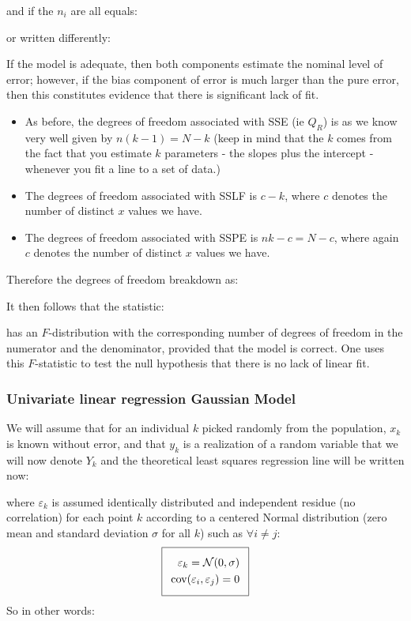 	and if the $n_i$ are all equals:
	
	or written differently:
	
	If the model is adequate, then both components estimate the nominal level of error; however, if the bias component of error is much larger than the pure error, then this constitutes evidence that there is significant lack of fit.
	
	\begin{itemize}
		\item As before, the degrees of freedom associated with SSE (ie $Q_R$) is as we know very well given by $n(k-1)=N-k$ (keep in mind that the $k$ comes from the fact that you estimate $k$ parameters - the slopes plus the intercept - whenever you fit a line to a set of data.)
	
		\item The degrees of freedom associated with SSLF is $c-k$, where $c$ denotes the number of distinct $x$ values we have.
	
		\item The degrees of freedom associated with SSPE is $nk-c=N-c$, where again $c$ denotes the number of distinct $x$ values we have.
	\end{itemize}
	Therefore the degrees of freedom breakdown as:
	
	It then follows that the statistic:
	
	has an $F$-distribution with the corresponding number of degrees of freedom in the numerator and the denominator, provided that the model is correct. One uses this $F$-statistic to test the null hypothesis that there is no lack of linear fit.
	
	
	
	\pagebreak
	\subsubsection{Univariate linear regression Gaussian Model}\label{univariate linear regression gaussian model}
	We will assume that for an individual $k$ picked randomly from the population, $x_k$ is known without error, and that $y_k$ is a realization of a random variable that we will now denote $Y_k$ and the theoretical least squares regression line will be written now:
	
	where $\varepsilon_k$ is assumed identically distributed and independent residue (no correlation) for each point $k$ according to a centered Normal distribution (zero mean and standard deviation $\sigma$ for all $k$) such as $\forall i\neq j$:
\begin{equation}
  \addtolength{\fboxsep}{5pt}
   \boxed{
   \begin{gathered}
		\begin{aligned}
			\varepsilon_k=\mathcal{N}(0,\sigma)\\
			\text{cov}(\varepsilon_i,\varepsilon_j)=0
		\end{aligned}
   \end{gathered}
   }
\end{equation}
	So in other words:
	
